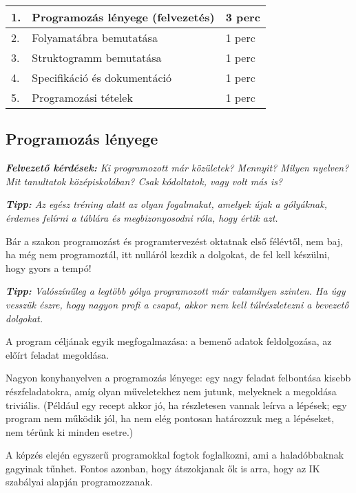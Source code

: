 \documentclass[../Main.tex]{subfiles}
\begin{document}
\begin{center}
    \begin{tabular}{| m{1.3 em} | m{} | m{} |}
    \hline
    1. & Programozás lényege (felvezetés) & 3 perc \\
    \hline
    2. & Folyamatábra bemutatása & 1 perc \\
    \hline
    3. & Struktogramm bemutatása & 1 perc \\
    \hline
    4. & Specifikáció és dokumentáció & 1 perc \\
    \hline
    5. & Programozási tételek & 1 perc \\
    \hline
    \end{tabular}
\end{center}

\subsection{Programozás lényege}
\textit{\textbf{Felvezető kérdések:} Ki programozott már közületek? Mennyit? Milyen nyelven?
Mit tanultatok középiskolában? Csak kódoltatok, vagy volt más is?}

\textit{\textbf{Tipp:} Az egész tréning alatt az olyan fogalmakat, amelyek 
újak a gólyáknak, érdemes felírni a táblára és megbizonyosodni róla, hogy értik azt.}

Bár a szakon programozást és programtervezést oktatnak első félévtől, nem baj,
ha még nem programoztál, itt nulláról kezdik a dolgokat, de fel kell készülni, hogy gyors a tempó!

\textit{\textbf{Tipp: } Valószínűleg a legtöbb gólya programozott már valamilyen szinten.
Ha úgy vesszük észre, hogy nagyon profi a csapat, akkor nem kell túlrészletezni a bevezető dolgokat.}

A program céljának egyik megfogalmazása: a bemenő adatok feldolgozása, az előírt feladat megoldása.

Nagyon konyhanyelven a programozás lényege: egy nagy feladat felbontása kisebb részfeladatokra,
 amíg olyan műveletekhez nem jutunk, melyeknek a megoldása triviális. (Például egy recept akkor jó,
 ha részletesen vannak leírva a lépések; egy program nem működik jól, ha nem elég pontosan határozzuk
 meg a lépéseket, nem térünk ki minden esetre.)

A képzés elején egyszerű programokkal fogtok foglalkozni, ami a haladóbbaknak gagyinak tűnhet.
Fontos azonban, hogy átszokjanak ők is arra, hogy az IK szabályai alapján programozzanak.
\end{document}
